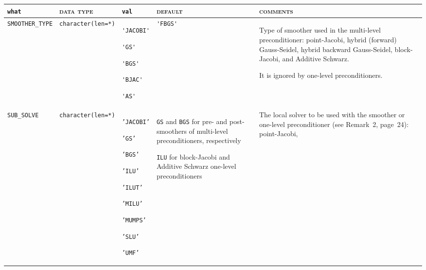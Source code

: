 \bsideways
\begin{center}
\small
\begin{tabular}{|p{3.6cm}|l|p{1.9cm}|p{3.6cm}|p{6.5cm}|}
\hline
\verb|what|              & \textsc{data type}        &  \verb|val|      &  \textsc{default}  &
\textsc{comments} \\ \hline
\verb|SMOOTHER_TYPE|  & \verb|character(len=*)|
                         & \verb|'JACOBI'| \par \verb|'GS'| \par \verb|'BGS'| \par \verb|'BJAC'|
                            \par \verb|'AS'|
                         & \verb|'FBGS'|
                         & Type of smoother used in the multi-level preconditioner:
                            point-Jacobi, hybrid (forward) Gauss-Seidel,
                            hybrid backward Gauss-Seidel, block-Jacobi, and
                            Additive Schwarz. \par
                            It is ignored by one-level preconditioners. \\ \hline
\verb|SUB_SOLVE|  & \verb|character(len=*)|
                         & \texttt{'JACOBI'} \par
                           \texttt{'GS'} \par \texttt{'BGS'} \par \texttt{'ILU'} \par 
                           \texttt{'ILUT'} \par \texttt{'MILU'} \par 
                           \par \texttt{'MUMPS'} \par \texttt{'SLU'} \par \texttt{'UMF'}
                         & \texttt{GS} and \texttt{BGS} for pre- and post-smoothers
                            of multi-level preconditioners, respectively \par
                            \texttt{ILU} for block-Jacobi and Additive Schwarz
                            one-level preconditioners
                         & The local solver to be used with the smoother or one-level
                            preconditioner (see Remark~2, page~24): point-Jacobi,

\end{tabular}
\end{center}
